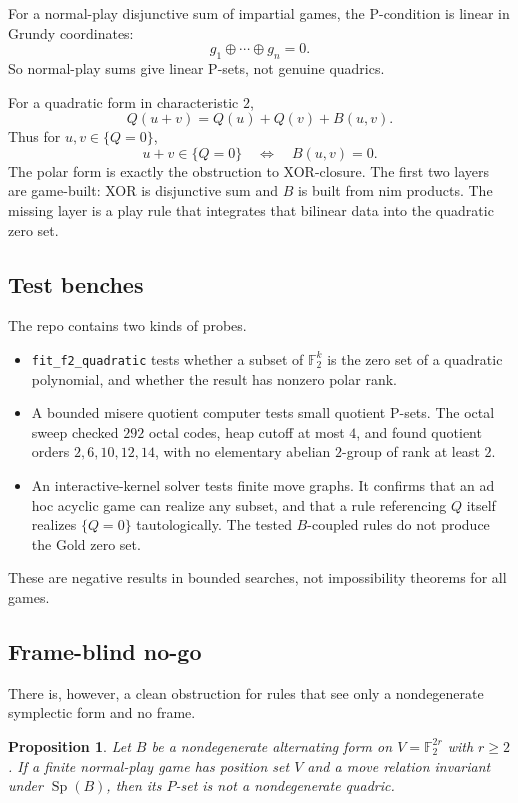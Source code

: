 \documentclass[11pt]{article}
\newtheorem{proposition}{Proposition}
\theoremstyle{definition}
\newcommand{\F}{\mathbb{F}}
\begin{document}
For a normal-play disjunctive sum of impartial games, the P-condition is
linear in Grundy coordinates:
\[
  g_1\oplus\cdots\oplus g_n=0.
\]
So normal-play sums give linear P-sets, not genuine quadrics.

For a quadratic form in characteristic $2$,
\[
  Q(u+v)=Q(u)+Q(v)+B(u,v).
\]
Thus for $u,v\in\{Q=0\}$,
\[
  u+v\in\{Q=0\}\quad\Longleftrightarrow\quad B(u,v)=0.
\]
The polar form is exactly the obstruction to XOR-closure. The first two layers
are game-built: XOR is disjunctive sum and $B$ is built from nim products. The
missing layer is a play rule that integrates that bilinear data into the
quadratic zero set.

\subsection{Test benches}

The repo contains two kinds of probes.

\begin{itemize}[leftmargin=*]
\item \texttt{fit\_f2\_quadratic} tests whether a subset of $\F_2^k$ is the zero
set of a quadratic polynomial, and whether the result has nonzero polar rank.
\item A bounded misere quotient computer tests small quotient P-sets. The octal
sweep checked $292$ octal codes, heap cutoff at most $4$, and found quotient
orders $2,6,10,12,14$, with no elementary abelian $2$-group of rank at least
$2$.
\item An interactive-kernel solver tests finite move graphs. It confirms that
an ad hoc acyclic game can realize any subset, and that a rule referencing $Q$
itself realizes $\{Q=0\}$ tautologically. The tested $B$-coupled rules do not
produce the Gold zero set.
\end{itemize}

These are negative results in bounded searches, not impossibility theorems for
all games.

\subsection{Frame-blind no-go}

There is, however, a clean obstruction for rules that see only a nondegenerate
symplectic form and no frame.

\begin{proposition}\label{prop:nogo}
Let $B$ be a nondegenerate alternating form on $V=\F_2^{2r}$ with $r\geq 2$.
If a finite normal-play game has position set $V$ and a move relation invariant
under $\operatorname{Sp}(B)$, then its $P$-set is not a nondegenerate quadric.
\end{proposition}
\end{document}

